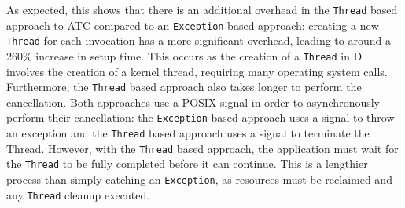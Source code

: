 As expected, this shows that there is an additional overhead in the
\texttt{Thread} based approach to ATC compared to an \texttt{Exception} based
approach: creating a new \texttt{Thread} for each
invocation has a more significant overhead, leading to around a 260\% increase 
in setup time. This occurs as the creation of a \texttt{Thread} in D involves
the creation of a kernel thread, requiring many operating system calls.
Furthermore, the \texttt{Thread} based approach also takes longer to perform
the cancellation. Both approaches use a POSIX signal in order to asynchronously
perform their cancellation: the \texttt{Exception} based approach uses a signal
to throw an exception and the \texttt{Thread} based approach uses a signal to
terminate the Thread. However, with the \texttt{Thread} based approach, the
application must wait for the \texttt{Thread} to be fully completed before it can
continue. This is a lengthier process than simply catching an
\texttt{Exception}, as resources must be reclaimed and any \texttt{Thread}
cleanup executed. 

